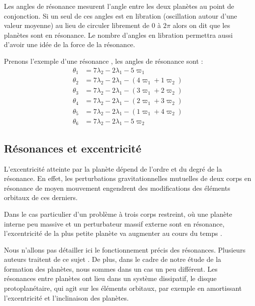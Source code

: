 Les angles de résonance mesurent l'angle entre les deux planètes au point de conjonction. Si un seul de ces angles est en
libration (oscillation autour d'une valeur moyenne) au lieu de circuler librement de $0$ à $2\pi$ alors on dit que les planètes
sont en résonance. Le nombre d'angles en libration permettra aussi d'avoir une idée de la force de la résonance.

Prenons l'exemple d'une résonance , les angles de résonance sont :
\begin{align*}
\theta_1 &= 7 \lambda_2 -2\lambda_1 - 5 \varpi_1\\
\theta_2 &= 7 \lambda_2 -2\lambda_1 - \left( 4 \varpi_1 + 1\varpi_2 \right)\\
\theta_3 &= 7 \lambda_2 -2\lambda_1 - \left( 3 \varpi_1 + 2\varpi_2 \right)\\
\theta_4 &= 7 \lambda_2 -2\lambda_1 - \left( 2 \varpi_1 + 3\varpi_2 \right)\\
\theta_5 &= 7 \lambda_2 -2\lambda_1 - \left( 1 \varpi_1 + 4\varpi_2 \right)\\
\theta_6 &= 7 \lambda_2 -2\lambda_1 - 5 \varpi_2
\end{align*}

\bigskip


\subsection{Résonances et excentricité}
L'excentricité atteinte par la planète dépend de l'ordre et du degré de la résonance. En effet, les perturbations gravitationnelles mutuelles de deux corps en
résonance de moyen mouvement engendrent des modifications des éléments orbitaux de ces derniers. 

Dans le cas particulier d'un problème à trois corps restreint, où une planète interne peu massive et un perturbateur massif externe sont en résonance, l'excentricité de la plus petite planète va augmenter au cours du temps \citep[eq.
(8.29)]{murray2000solar}. 

Nous n'allons pas détailler ici le fonctionnement précis des résonances. Plusieurs auteurs traitent de ce sujet
\citep{greenberg1977orbit, peale1986orbital, malhotra1988phd}. De plus, dans le cadre de notre étude de la formation des
planètes, nous sommes dans un cas un
peu différent. Les résonances entre planètes ont lieu dans un système dissipatif, le disque protoplanétaire, qui agit sur les
éléments orbitaux, par exemple en amortissant l'excentricité et l'inclinaison des planètes.

